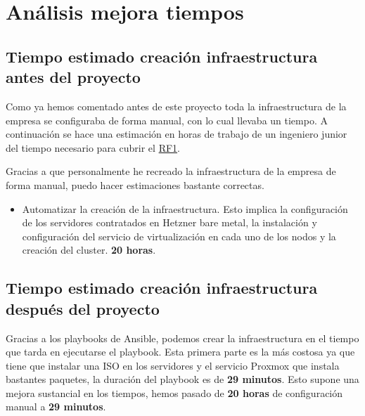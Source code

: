 \section{Análisis mejora tiempos}
\label{analisis_tiempos} 
\subsection{Tiempo estimado creación infraestructura antes del proyecto}
\begin{text}
        Como ya hemos comentado antes de este proyecto toda la infraestructura de la empresa se configuraba de forma manual, con lo cual llevaba un tiempo. A continuación se hace una estimación en horas de trabajo de un ingeniero junior del tiempo necesario para cubrir el \hyperref[RF1]{RF1}.

        Gracias a que personalmente he recreado la infraestructura de la empresa de forma manual, puedo hacer estimaciones bastante correctas.

        \begin{itemize}
                \item Automatizar la creación de la infraestructura. Esto implica la configuración de los servidores contratados en Hetzner bare metal, la instalación y configuración del servicio de virtualización en cada uno de los nodos y la creación del cluster.  \textbf{20 horas}.
        \end{itemize}


\end{text}

\subsection{Tiempo estimado creación infraestructura después del proyecto}
\begin{text}
        Gracias a los playbooks de Ansible, podemos crear la infraestructura en el tiempo que tarda en ejecutarse el playbook. Esta primera parte es la más costosa ya que tiene que instalar una ISO en los servidores y el servicio Proxmox que instala bastantes paquetes, la duración del playbook es de \textbf{29 minutos}. Esto supone una mejora sustancial en los tiempos, hemos pasado de \textbf{20 horas} de configuración manual a \textbf{29 minutos}.
\end{text}

